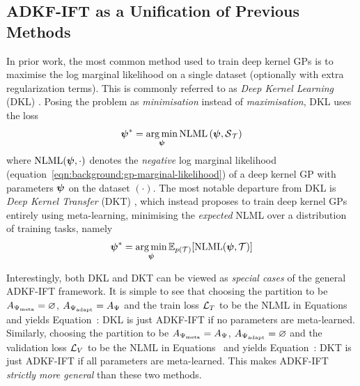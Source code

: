     
    \subsection{ADKF-IFT as a Unification of Previous Methods}\label{ssec:dkl-dkt-comparison}
    In prior work, the most common method used to train deep kernel GPs is to maximise the
    log marginal likelihood on a single dataset (optionally with extra regularization terms).
    This is commonly referred to as \emph{Deep Kernel Learning} (DKL) \citep{wilson2016deep}.
    Posing the problem as \emph{minimisation} instead of \emph{maximisation},
    DKL uses the loss
    \begin{equation}\label{eq:dkl-objective}
        \operatorname{\boldsymbol{\psi}}^* = \operatorname*{arg\,min}_{\operatorname{\boldsymbol{\psi}}}\mathrm{NLML}\left(\operatorname{\boldsymbol{\psi}},\operatorname{\mathcal{S}}_{\operatorname{\mathcal{T}}}\right) 
    \end{equation}
    where 
    $\mathrm{NLML}(\operatorname{\boldsymbol{\psi}},\cdot)$ denotes the \emph{negative} log marginal likelihood 
    (equation~\ref{eqn:background:gp-marginal-likelihood})
    of a deep kernel GP with parameters $\operatorname{\boldsymbol{\psi}}$ on the dataset $(\cdot)$.
    The most notable departure from DKL is \emph{Deep Kernel Transfer} (DKT) \citep{Patacchiola20},
    which instead proposes to train deep kernel GPs entirely using meta-learning,
    minimising the \emph{expected} NLML over a distribution of training tasks,
    namely
    \begin{equation}\label{eq:dkt-objective}
        \operatorname{\boldsymbol{\psi}}^* = \operatorname*{arg\,min}_{\operatorname{\boldsymbol{\psi}}}\operatorname{\mathbb{E}}_{p(\operatorname{\mathcal{T}})}[\mathrm{NLML}(\operatorname{\boldsymbol{\psi}},\operatorname{\mathcal{T}})]
    \end{equation}
    
    Interestingly, both DKL and DKT can be viewed as \emph{special cases}
    of the general ADKF-IFT framework.
    It is simple to see that choosing the partition to be $A_{\Psi_{\text{meta}}}=\varnothing$,  $A_{\Psi_{\text{adapt}}}=A_{\Psi}$ and the train loss $\operatorname{\mathcal{L}}_T$ to be the NLML in Equations~ and  yields Equation~:
    DKL is just ADKF-IFT if no parameters are meta-learned.
    Similarly, choosing the partition to be $A_{\Psi_{\text{meta}}}=A_{\Psi}$, $A_{\Psi_{\text{adapt}}}=\varnothing$
     and the validation loss $\operatorname{\mathcal{L}}_V$ to be the NLML in Equations~ and  yields Equation~:
    DKT is just ADKF-IFT if all parameters are meta-learned.
    This makes ADKF-IFT \emph{strictly more general} than these two methods.

    
